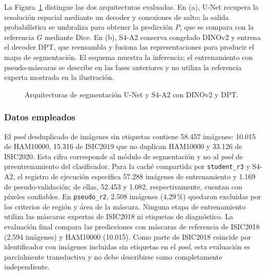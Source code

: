 La Figura~\ref{fig:arquitecturas-segmentacion} distingue las dos arquitecturas evaluadas. En (a), U-Net recupera la resolución espacial mediante un decoder y conexiones de salto; la salida probabilística se umbraliza para obtener la predicción $P$, que se compara con la referencia $G$ mediante Dice. En (b), S4-A2 conserva congelado DINOv2 y entrena el decoder DPT, que reensambla y fusiona las representaciones para producir el mapa de segmentación. El esquema muestra la inferencia; el entrenamiento con pseudo-máscaras se describe en las fases anteriores y no utiliza la referencia experta mostrada en la ilustración.

\begin{figure}[!htbp]
\caption{Arquitecturas de segmentación U-Net y S4-A2 con DINOv2 y DPT.}
\label{fig:arquitecturas-segmentacion}
\centering

\par\smallskip
\raggedright\fontsize{11}{13}\selectfont\singlespacing
\par{}
\par
\end{figure}

\subsubsection{Datos empleados}

\begin{sloppypar}
El \textit{pool} desduplicado de imágenes sin etiquetas contiene 58.457 imágenes: 10.015 de HAM10000, 15.316 de ISIC2019 que no duplican HAM10000 y 33.126 de ISIC2020. Esta cifra corresponde al módulo de segmentación y no al \textit{pool} de preentrenamiento del clasificador. Para la caché compartida por \texttt{student\_r3} y S4-A2, el registro de ejecución especifica 57.288 imágenes de entrenamiento y 1.169 de pseudo-validación; de ellas, 52.453 y 1.082, respectivamente, cuentan con píxeles confiables. En \texttt{pseudo\_r2}, 2.508 imágenes (4,29\,\%) quedaron excluidas por los criterios de región y área de la máscara. Ninguna etapa de entrenamiento utiliza las máscaras expertas de ISIC2018 ni etiquetas de diagnóstico. La evaluación final compara las predicciones con máscaras de referencia de ISIC2018 (2.594 imágenes) y HAM10000 (10.015). Como parte de ISIC2018 coincide por identificador con imágenes incluidas sin etiquetas en el \textit{pool}, esta evaluación es parcialmente transductiva y no debe describirse como completamente independiente.
\end{sloppypar}

